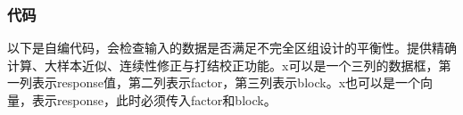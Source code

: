\subsubsection{代码}
以下是自编代码，会检查输入的数据是否满足不完全区组设计的平衡性。提供精确计算、大样本近似、连续性修正与打结校正功能。x可以是一个三列的数据框，第一列表示response值，第二列表示factor，第三列表示block。x也可以是一个向量，表示response，此时必须传入factor和block。
\inputminted[bgcolor=white, linenos, frame=single, numbersep=5pt, breaklines]{r}{nonparametric-statistics/chapter3/durbin.R}